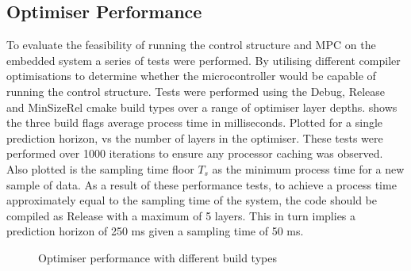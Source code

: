 \documentclass[11pt,a4paper]{article}
\begin{document}
\subsection{Optimiser Performance}
\label{sub:optimiser_performance}
To evaluate the feasibility of running the control structure and MPC on the embedded system a series of tests were performed. By utilising different compiler optimisations to determine whether the microcontroller would be capable of running the control structure. Tests were performed using the Debug, Release and MinSizeRel cmake build types over a range of optimiser layer depths.  shows the three build flags average process time in milliseconds. Plotted for a single prediction horizon, vs the number of layers in the optimiser. These tests were performed over 1000 iterations to ensure any processor caching was observed. Also plotted is the sampling time floor $T_s$ as the minimum process time for a new sample of data. \newline
As a result of these performance tests, to achieve a process time approximately equal to the sampling time of the system, the code should be compiled as Release with a maximum of 5 layers. This in turn implies a prediction horizon of 250 ms given a sampling time of 50 ms.

\begin{figure}[hbt!]
    \centering
    \caption{Optimiser performance with different build types}
    \label{fig:optimiser_process_time}
\end{figure}
\end{document}
